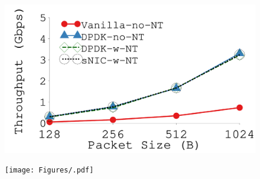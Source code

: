 {\begin{figure}[th]
\begin{minipage}{\figWidthSix}
\begin{center}
\vspace{-0.1in}
{
}
\end{center}
\end{minipage}
\begin{minipage}{\figWidthSix}
\begin{center}
\centerline{\includegraphics[width=\columnwidth]{Figures/g_plot_ovs.pdf}}
\vspace{-0.1in}
{
}
\end{center}
\end{minipage}
\begin{minipage}{1.65in}
\begin{center}
\centerline{\texttt{[image: Figures/.pdf]}}
\vspace{-0.1in}
{
}
\end{center}
\end{minipage}
\fi
\vspace{-0.15in}
\end{figure}
}